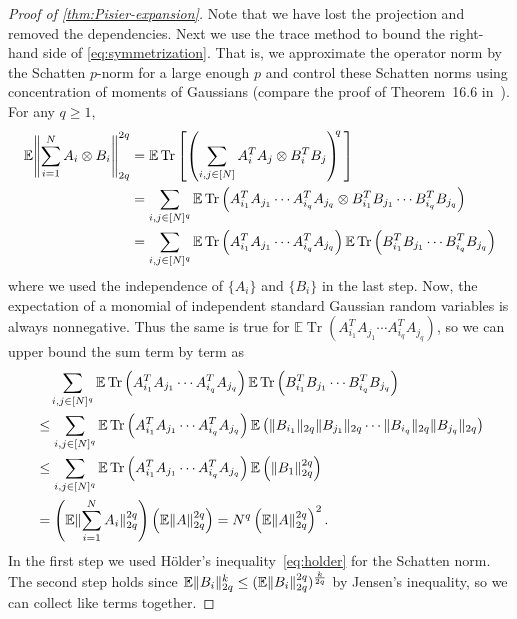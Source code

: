 \documentclass[aos]{imsart}
\theoremstyle{definition}
\numberwithin{equation}{section}
\DeclareMathOperator{\tr}{Tr}
\DeclarePairedDelimiter{\norm}{\lVert}{\rVert}
\newcommand{\ot}{\otimes}
\newcommand{\E}{\mathbb{E}}
\begin{document}
\begin{appendix}
\begin{proof} [Proof of \cref{thm:Pisier-expansion}]
Note that we have lost the projection and removed the dependencies.
Next we use the trace method to bound the right-hand side of \cref{eq:symmetrization}.
That is, we approximate the operator norm by the Schatten $p$-norm for a large enough $p$ and control these Schatten norms using concentration of moments of Gaussians (compare the proof of Theorem~16.6 in~\cite{pisier2012grothendieck}).
For any $q\geq1$,
\begin{align*}
\E \norm*{\sum_{i=1}^N A_i \ot B_i}_{2q}^{2q}
&= \E \tr \left[ \left( \sum_{i,j\in[N]} A_i^T A_j \ot B_i^T B_j \right)^{\!\!q} \, \right] \\
&= \sum_{i, j \in [N]^q} \E \tr \left( A^T_{i_1} A_{j_1} \cdots A^T_{i_q} A_{j_q} \ot B^T_{i_1} B_{j_1} \cdots B^T_{i_q} B_{j_q} \right) \\
&= \sum_{i, j \in [N]^q} \E \tr \left( A^T_{i_1} A_{j_1} \cdots A^T_{i_q} A_{j_q} \right) \E \tr \left( B^T_{i_1} B_{j_1} \cdots B^T_{i_q} B_{j_q} \right)
\end{align*}
where we used the independence of $\{A_i\}$ and $\{B_i\}$ in the last step.
Now, the expectation of a monomial of independent standard Gaussian random variables is always nonnegative.
Thus the same is true for $\E \tr ( A^T_{i_1} A_{j_1} \cdots A^T_{i_q} A_{j_q} )$, so we can upper bound the sum term by term as
\begin{align*}
&\quad \sum_{i, j \in [N]^q} \E \tr \left( A^T_{i_1} A_{j_1} \cdots A^T_{i_q} A_{j_q} \right) \E \tr \left( B^T_{i_1} B_{j_1} \cdots B^T_{i_q} B_{j_q} \right) \\
&\leq \sum_{i, j \in [N]^q} \E \tr \left( A^T_{i_1} A_{j_1} \cdots A^T_{i_q} A_{j_q} \right) \E \left( \norm{ B_{i_1} }_{2q} \norm{B_{j_1}}_{2q} \cdots \norm{ B_{i_q} }_{2q} \norm{B_{j_q}}_{2q} \right) \\
&\leq \sum_{i, j \in [N]^q} \E \tr \left( A^T_{i_1} A_{j_1} \cdots A^T_{i_q} A_{j_q} \right) \E \left( \norm{ B_1 }_{2q}^{2q} \right) \\
&= \left( \E\norm{\sum_{i=1}^N A_i}_{2q}^{2q} \right) \left( \E \norm{ A }_{2q}^{2q} \right)
= N^q \left( \E\norm{A}_{2q}^{2q} \right)^2.
\end{align*}
In the first step we used H\"older's inequality~\eqref{eq:holder} for the Schatten norm.
The second step holds since $\E\norm{B_i}_{2q}^k \leq (\E \norm{B_i}_{2q}^{2q})^{\frac k {2q}}$ by Jensen's inequality, so we can collect like terms together.

\end{proof}
\end{appendix}
\end{document}
